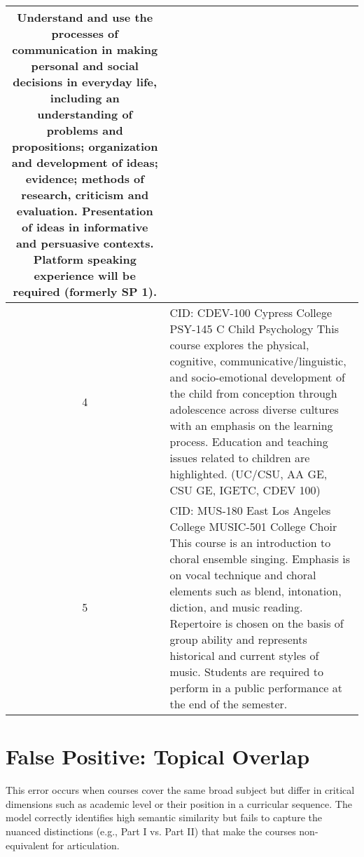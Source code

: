 \begin{longtable}{ >{\baselineskip=12pt}c >{\baselineskip=12pt}p{} }
Understand and use the processes of communication in making personal and social decisions in everyday life, including an understanding of problems and propositions; organization and development of ideas; evidence; methods of research, criticism and evaluation. Presentation of ideas in informative and persuasive contexts. Platform speaking experience will be required (formerly SP 1).\\
\midrule
4 & CID: CDEV-100 \newline
Cypress College \newline
PSY-145 C Child Psychology \newline
This course explores the physical, cognitive, communicative/linguistic, and socio-emotional development of the child from conception through adolescence across diverse cultures with an emphasis on the learning process. Education and teaching issues related to children are highlighted. (UC/CSU, AA GE, CSU GE, IGETC, CDEV 100)\\
\midrule
5 & CID: MUS-180 \newline
East Los Angeles College \newline
MUSIC-501 College Choir \newline
This course is an introduction to choral ensemble singing. Emphasis is on vocal technique and choral elements such as blend, intonation, diction, and music reading. Repertoire is chosen on the basis of group ability and represents historical and current styles of music. Students are required to perform in a public performance at the end of the semester.\\
\bottomrule
\end{longtable}

\section{False Positive: Topical Overlap}\label{app:topicoverlap}
This error occurs when courses cover the same broad subject but differ in critical dimensions such as academic level or their position in a curricular sequence. The model correctly identifies high semantic similarity but fails to capture the nuanced distinctions (e.g., Part I vs. Part II) that make the courses non-equivalent for articulation.


